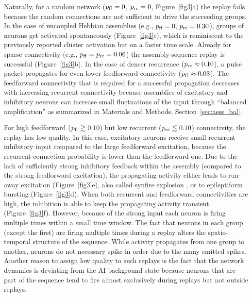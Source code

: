     Naturally, for a random network ($p_{\rm ff} = 0$, $p_{\rm rc} = 0$,
    Figure~\ref{fig3}a) the replay fails because the random connections are not
    sufficient to drive the succeeding groups. In the case of uncoupled
    Hebbian assemblies (e.g., $p_{\rm ff}=0,\, p_{\rm rc} = 0.30$), groups of
    neurons get activated spontaneously (Figure~\ref{fig3}c), which is reminiscent
    to the previously reported cluster activation \citep{Litwin2012} but
    on a faster time scale. Already for sparse connectivity (e.g., $p_{\rm ff}=
    p_{\rm rc} = 0.06$) the assembly-sequence replay is successful
    (Figure~\ref{fig3}b). In the case of denser recurrence ($p_{\rm rc} \approx
    0.10$), a pulse packet propagates for even lower feedforward connectivity
    ($p_{\rm ff} \approx 0.03$). The feedforward connectivity that is required
    for a successful propagation decreases with increasing recurrent
    connectivity because assemblies of excitatory and inhibitory neurons can
    increase small fluctuations of the input through ``balanced amplification''
    \citep{Murphy2009, Hennequin2012} as summarized in Materials and Methods,
    Section~\ref{sec:asss_bal}.

    For high feedforward ($p_{\rm ff} \gtrsim 0.10$) but low recurrent ($p_{\rm
    rc} \lesssim  0.10$) connectivity, the replay has low quality. In this
    case, excitatory neurons receive small recurrent inhibitory input compared
    to the large feedforward excitation, because the recurrent connection
    probability is lower than the feedforward one. Due to the lack of
    sufficiently strong inhibitory feedback within the assembly (compared to
    the strong feedforward excitation), the propagating activity either leads
    to run-away excitation (Figure~\ref{fig3}e), also called synfire explosion
    \citep{Mehring2003, Aviel2004}, or to epileptiform bursting
    (Figure~\ref{fig3}d). When both recurrent and feedforward connectivities are
    high, the inhibition is able to keep the propagating activity transient
    (Figure~\ref{fig3}f). However, because of the strong input each neuron is
    firing multiple times within a small time window. The fact that neurons in
    each group (except the first) are firing multiple times during a replay
    alters the spatio-temporal structure of the sequence. While activity
    propagates from one group to another, neurons do not necessary spike in
    order due to the many emitted spikes. Another reason to assign low quality
    to such replays is the fact that the network dynamics is deviating from the
    AI background state because neurons that are part of the sequence tend to
    fire almost exclusively during replays but not outside replays.

